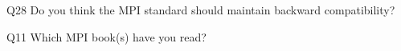 \begin{description}%
\item{Q28} Do you think the MPI standard should maintain backward compatibility?%
\item{Q11} Which MPI book(s) have you read?%
\end{description}%
